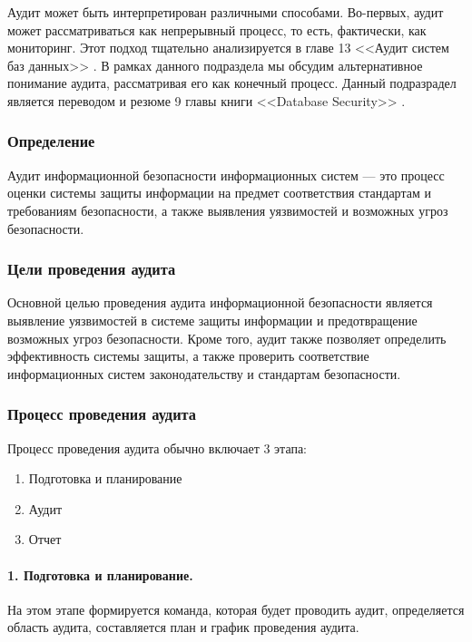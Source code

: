 Аудит может быть интерпретирован различными способами. Во-первых, аудит может рассматриваться как непрерывный процесс, то есть, фактически, как мониторинг. Этот подход тщательно анализируется в главе 13 <<Аудит систем баз данных>> \autocite{Smirnov2007}.
В рамках данного подраздела мы обсудим альтернативное понимание аудита, рассматривая его как конечный процесс. Данный подразрадел является переводом и резюме 9 главы книги <<Database Security>> \autocite{DatabaseSecurity}.

\subsubsection{Определение}

Аудит информационной безопасности информационных систем — это процесс оценки системы защиты информации на предмет соответствия стандартам и требованиям безопасности, а также выявления уязвимостей и возможных угроз безопасности.

\subsubsection{Цели проведения аудита}

Основной целью проведения аудита информационной безопасности является выявление уязвимостей в системе защиты информации и предотвращение возможных угроз безопасности. Кроме того, аудит также позволяет определить эффективность системы защиты, а также проверить соответствие информационных систем законодательству и стандартам безопасности.

\subsubsection{Процесс проведения аудита}

Процесс проведения аудита обычно включает 3 этапа:
\begin{enumerate}
	\item Подготовка и планирование
	\item Аудит
	\item Отчет
\end{enumerate}

\paragraph{1. Подготовка и планирование.}

На этом этапе формируется команда, которая будет проводить аудит, определяется область аудита, составляется план и график проведения аудита.

